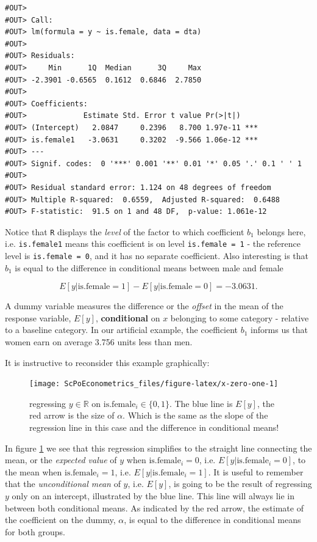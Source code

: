 \documentclass[]{book}
\newenvironment{note}{\begin{tcolorbox}[colback=blue!5!white,colframe=blue!75!black,title=\textbf{Note:}]}{\end{tcolorbox}}
\theoremstyle{definition}
\theoremstyle{definition}
\theoremstyle{definition}
\theoremstyle{remark}
\begin{document}
\begin{verbatim}
#OUT> 
#OUT> Call:
#OUT> lm(formula = y ~ is.female, data = dta)
#OUT> 
#OUT> Residuals:
#OUT>     Min      1Q  Median      3Q     Max 
#OUT> -2.3901 -0.6565  0.1612  0.6846  2.7850 
#OUT> 
#OUT> Coefficients:
#OUT>             Estimate Std. Error t value Pr(>|t|)    
#OUT> (Intercept)   2.0847     0.2396   8.700 1.97e-11 ***
#OUT> is.female1   -3.0631     0.3202  -9.566 1.06e-12 ***
#OUT> ---
#OUT> Signif. codes:  0 '***' 0.001 '**' 0.01 '*' 0.05 '.' 0.1 ' ' 1
#OUT> 
#OUT> Residual standard error: 1.124 on 48 degrees of freedom
#OUT> Multiple R-squared:  0.6559,  Adjusted R-squared:  0.6488 
#OUT> F-statistic:  91.5 on 1 and 48 DF,  p-value: 1.061e-12
\end{verbatim}

Notice that \texttt{R} displays the \emph{level} of the factor to which
coefficient \(b_1\) belongs here, i.e. \texttt{is.female1} means this
coefficient is on level \texttt{is.female\ =\ 1} - the reference level
is \texttt{is.female\ =\ 0}, and it has no separate coefficient. Also
interesting is that \(b_1\) is equal to the difference in conditional
means between male and female

\[E[y|\text{is.female}=1] - E[y|\text{is.female}=0]=-3.0631.\]

\begin{note}
A dummy variable measures the difference or the \emph{offset} in the
mean of the response variable, \(E[y]\), \textbf{conditional} on \(x\)
belonging to some category - relative to a baseline category. In our
artificial example, the coefficient \(b_1\) informs us that women earn
on average 3.756 units less than men.
\end{note}

It is instructive to reconsider this example graphically:

\begin{figure}

{\centering \texttt{[image: ScPoEconometrics\_files/figure-latex/x-zero-one-1]} 

}

\caption{regressing $y \in \mathbb{R}$ on $\text{is.female}_i \in \{0,1\}$. The blue line is $E[y]$, the red arrow is the size of $\alpha$. Which is the same as the slope of the regression line in this case and the difference in conditional means!}\label{fig:x-zero-one}
\end{figure}

In figure \ref{fig:x-zero-one} we see that this regression simplifies to
the straight line connecting the mean, or the \emph{expected value} of
\(y\) when \(\text{is.female}_i = 0\), i.e.
\(E[y|\text{is.female}_i=0]\), to the mean when
\(\text{is.female}_i=1\), i.e. \(E[y|\text{is.female}_i=1]\). It is
useful to remember that the \emph{unconditional mean} of \(y\), i.e.
\(E[y]\), is going to be the result of regressing \(y\) only on an
intercept, illustrated by the blue line. This line will always lie in
between both conditional means. As indicated by the red arrow, the
estimate of the coefficient on the dummy, \(\alpha\), is equal to the
difference in conditional means for both groups.
\end{document}
